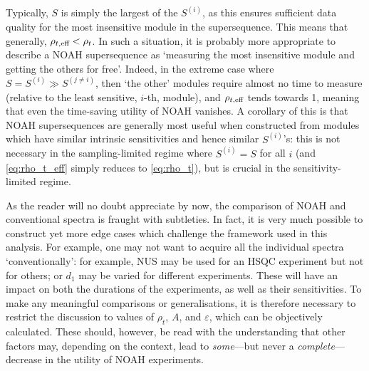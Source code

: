 Typically, $S$ is simply the largest of the $S^{(i)}$, as this ensures sufficient data quality for the most insensitive module in the supersequence.
This means that generally, $\rho_{t,\text{eff}} < \rho_t$.
In such a situation, it is probably more appropriate to describe a NOAH supersequence as `measuring the most insensitive module and getting the others for free'.
Indeed, in the extreme case where $S = S^{(i)} \gg S^{(j\neq i)}$, then `the other' modules require almost no time to measure (relative to the least sensitive, $i$-th, module), and $\rho_{t,\text{eff}}$ tends towards 1, meaning that even the time-saving utility of NOAH vanishes.
A corollary of this is that NOAH supersequences are generally most useful when constructed from modules which have similar intrinsic sensitivities and hence similar $S^{(i)}$'s: this is not necessary in the sampling-limited regime where $S^{(i)} = S$ for all $i$ (and \cref{eq:rho_t_eff} simply reduces to \cref{eq:rho_t}), but is crucial in the sensitivity-limited regime.

As the reader will no doubt appreciate by now, the comparison of NOAH and conventional spectra is fraught with subtleties.
In fact, it is very much possible to construct yet more edge cases which challenge the framework used in this analysis.
For example, one may not want to acquire all the individual spectra `conventionally': for example, NUS may be used for an HSQC experiment but not for others; or $d_1$ may be varied for different experiments.
These will have an impact on both the durations of the experiments, as well as their sensitivities.
To make any meaningful comparisons or generalisations, it is therefore necessary to restrict the discussion to values of $\rho_t$, $A$, and $\varepsilon$, which can be objectively calculated.
These should, however, be read with the understanding that other factors may, depending on the context, lead to \textit{some}---but never a \textit{complete}---decrease in the utility of NOAH experiments.
